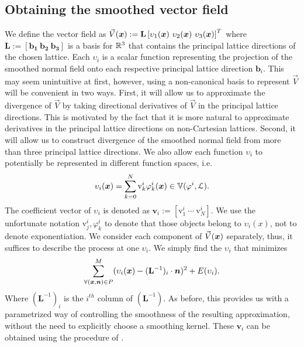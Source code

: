 \subsection{Obtaining the smoothed vector field} \label{sec:getting_vd}
\label{sec:obtainingV}
We define the vector field as $\vec{V}(\vx):=\mathbf{L} \left[\upsilon_1(\vx) \ \upsilon_2(\vx) \ \upsilon_3(\vx)\right]^T$ where $\mathbf{L := [b_1 \ b_2 \ b_3]}$ is a basis for $\realn^3$ that contains the principal lattice directions of the chosen lattice.
Each $\upsilon_i$ is a scalar function representing the projection of the smoothed normal field onto each respective principal lattice direction $\mathbf{b}_i$. 
This may seem unintuitive at first, however, using a non-canonical basis to represent $\vec{V}$ will be convenient in two ways. 
First, it will allow us to approximate the divergence of $\vec{V}$ by taking directional derivatives of $\vec{V}$ in the principal lattice directions. 
This is motivated by the fact that it is more natural to approximate derivatives in the principal lattice directions on non-Cartesian lattices. 
Second, it will allow us to construct divergence of the smoothed normal field from more than three principal lattice directions. 
We also allow each function $\upsilon_i$ to potentially be represented in different function spaces, i.e. {\small 
\begin{equation} 
	\upsilon_i(\vx) = \sum_{k=0}^N \text{v}_k^i \varphi_k^i(\vx) \in \aspace{\lattice{L}}{\varphi^i}.
\end{equation}}
The coefficient vector of $\upsilon_i$ is denoted as $\mathbf{v}_i:=\left[\text{v}_1^i \ \cdots \ \text{v}_N^i \right]$.
We use the unfortunate notation $\text{v}_j^i, \varphi_k^i$ to denote that those objects belong to $\upsilon_i(x)$, not to denote exponentiation. 
We consider each component of $\vec{V}(\vx)$ separately, thus, it suffices to describe the process at one $\upsilon_i$. 
We simply find the $\upsilon_i$ that minimizes {\small 
\begin{equation} \label{eq:vari_eqn}
 	\sump_{\forall (\vx,\vn) \in P }^{M} (\upsilon_i(\vx) - (\mathbf{L}^{-1})_i \cdot \vect{n})^2 + E(\upsilon_i).
\end{equation} }
Where $(\mathbf{L}^{-1})_i$ is the $i^{th}$ column of $(\mathbf{L}^{-1}).$ 
As before, this provides us with a parametrized way of controlling the smoothness of the resulting approximation, without the need to explicitly choose a smoothing kernel. 
These $\mathbf{v}_i$ can be obtained using the procedure of .


